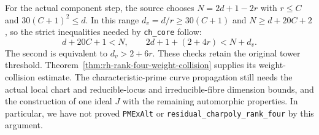 For the actual component step, the source chooses
\(N=2d+1-2r\) with \(r\leq C\) and
\(30(C+1)^2\leq d\). In this range \(d_v=d/r\geq30(C+1)\)
and \(N\geq d+20C+2\), so the strict inequalities needed by
\texttt{ch\_core} follow:
\[
 d+20C+1<N,\qquad
 2d+1+(2+4r)<N+d_v.
\]
The second is equivalent to \(d_v>2+6r\).
These checks retain the original tower threshold.
Theorem~\ref{thm:rh-rank-four-weight-collision} supplies its
weight-collision estimate. The characteristic-prime curve
propagation still needs the actual local chart and reducible-locus
and irreducible-fibre dimension bounds, and the construction of one
ideal \(J\) with the remaining automorphic properties.
In particular, we have not proved \texttt{PMExAlt} or
\texttt{residual\_charpoly\_rank\_four} by this argument.
